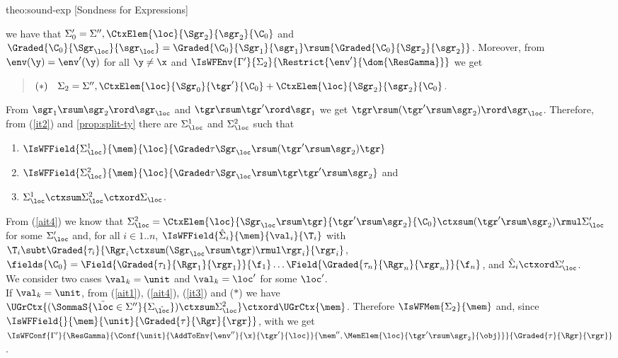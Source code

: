 \begin{proofOf}{theo:sound-exp} [Sondness for Expressions]
\begin{description}
\bigskip
{}
 we have that $\Sigma'_0= \Sigma'',\CtxElem{\loc}{\Sgr_2}{\sgr_2}{\C_0}$ and  ${\Graded{\C_0}{\Sgr_\loc}{\sgr_\loc}}={\Graded{\C_0}{\Sgr_1}{\sgr_1}}\rsum{\Graded{\C_0}{\Sgr_2}{\sgr_2}}$. Moreover, from $\env(\y)=\env'(\y)$ for all $\y\neq\x$ and $\IsWFEnv{\Gamma'}{\Sigma_2}{\Restrict{\env'}{\dom{\ResGamma}}}$ we get 
 \begin{quote}
 $(\ast)\quad\Sigma_2= \Sigma'',\CtxElem{\loc}{\Sgr_0}{\tgr'}{\C_0}+\CtxElem{\loc}{\Sgr_2}{\sgr_2}{\C_0}$.
 \end{quote}
From $\sgr_1\rsum\sgr_2\rord\sgr_\loc$ and $\tgr\rsum\tgr'\rord\sgr_1$ we get $\tgr\rsum(\tgr'\rsum\sgr_2)\rord\sgr_\loc$. 
Therefore, from 
(\ref{it2}) and \cref{prop:split-ty} there are $\Sigma_{\loc}^1$ and $\Sigma_{\loc}^2$ such that 
\begin{enumerate}%
\item \label{ait3}
$\IsWFField{\Sigma_{\loc}^1}{\mem}{\loc}{\Graded\tau{\Sgr_\loc\rsum(\tgr'\rsum\sgr_2)}{\tgr}}$
\item \label{ait4}$\IsWFField{\Sigma_{\loc}^2}{\mem}{\loc}{\Graded\tau{\Sgr_\loc\rsum\tgr}{\tgr'\rsum\sgr_2}}$ and
\item \label{ait5} $\Sigma_{\loc}^1\ctxsum\Sigma_{\loc}^2\ctxord\Sigma_{\loc}$.
\end{enumerate}
From (\ref{ait4}) we know that %
$\Sigma_{\loc}^2 = \CtxElem{\loc}{\Sgr_\loc\rsum\tgr}{\tgr'\rsum\sgr_2}{\C_0}\ctxsum (\tgr'\rsum\sgr_2)\rmul\Sigma'_\loc$ for some  $\Sigma'_\loc$ and,
for all $i \in 1..n$, 
$\IsWFField{\hat\Sigma_i}{\mem}{\val_i}{\T_i}$ with 
$\T_i\subt\Graded{\tau_i}{\Rgr_i\ctxsum(\Sgr_\loc\rsum\tgr)\rmul\rgr_i}{\rgr_i}$, 
$\fields{\C_0} = \Field{\Graded{\tau_1}{\Rgr_1}{\rgr_1}}{\f_1} \ldots \Field{\Graded{\tau_n}{\Rgr_n}{\rgr_n}}{\f_n}$, 
and $\hat\Sigma_i \ctxord \Sigma'_\loc$. 
\\
%
We consider two cases $\val_k=\unit$ and $\val_k=\loc'$ for some $\loc'$.\\ 
If $\val_k=\unit$, 
from (\ref{ait1}), (\ref{ait4}), (\ref{it3}) and ($\ast$) we have $\UGrCtx{(\SommaS{\tilde{\loc}\in\Sigma''}{\Sigma_{\tilde\loc}})\ctxsum\Sigma^2_{\loc}}\ctxord\UGrCtx{\mem}$. Therefore 
 $\IsWFMem{\Sigma_2}{\mem}$ and, since 
$\IsWFField{}{\mem}{\unit}{\Graded{\tau}{\Rgr}{\rgr}}$, with  we get  
$\IsWFConf{\Gamma'}{\ResGamma}{{\Conf{\unit}{\AddToEnv{\env''}{\x}{\tgr'}{\loc}}{\mem'',\MemElem{\loc}{\tgr'\rsum\sgr_2}{\obj} }}}{\Graded{\tau}{\Rgr}{\rgr}}$.

\end{description}
\end{proofOf}
